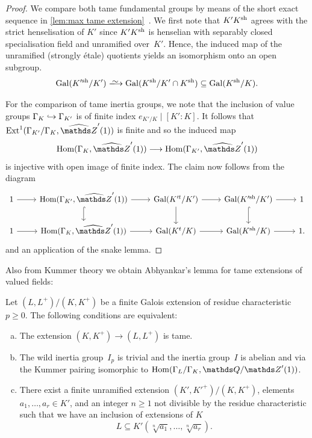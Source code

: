 \begin{proof}
We compare both tame fundamental groups by means of the short exact sequence in \cref{lem:max tame extension}~.
We first note that $K'K^{\rm sh}$ agrees with the strict henselisation of $K'$  since $K'K^{\rm sh}$ is henselian with separably closed specialisation field and unramified over~$K'$.
Hence, the induced map of the unramified (strongly \'etale) quotients yields an isomorphism onto an open subgroup.
\[
\Gal(K'^\sh/K') \isomto \Gal(K^\sh/K'\cap K^\sh) \subseteq \Gal(K^\sh/K).
\]

For the comparison of tame inertia groups, we note that the inclusion of value groups $\Gamma_K \hookrightarrow \Gamma_{K'}$
is of finite index $e_{K'/K} \mid [K':K]$. It follows that $\Ext^1(\Gamma_{K'}/\Gamma_K, \hZ'(1))$ is finite and so the induced map 
\[
\Hom(\Gamma_K,\hZ'(1)) \la \Hom(\Gamma_{K'},\hZ'(1))
\]
is injective with open image of finite index. The claim now follows from  the diagram
\[
 \begin{tikzcd}
    1 \ar[r]    & \Hom(\Gamma_{K'},\hZ'(1)) \ar[r] \ar[d,hookrightarrow]   & \Gal(K'^t/K') \ar[r]    \ar[d]  & \Gal(K'^\sh/K') \ar[r]  \ar[d,hookrightarrow]   & 1 \\
    1 \ar[r]    & \Hom(\Gamma_K,\hZ'(1)) \ar[r]   & \Gal(K^t/K) \ar[r]    & \Gal(K^\sh/K) \ar[r]  & 1. 
 \end{tikzcd}
\]
and an application of the snake lemma.
\end{proof}

Also from Kummer theory we obtain Abhyankar's lemma for tame extensions of valued fields:

\begin{lem} \label{lem:tameness-conditions-galois}
    Let $(L,L^+)/(K,K^+)$ be a finite Galois extension of residue characteristic $p \ge 0$.
    The following conditions are equivalent:
    \begin{enumerate}[(a)]
        \item 
        \label{lemitem:tame}
        The extension $(K,K^+) \to (L,L^+)$ is tame.
        \item
        \label{lemitem:tame-galois}
        The wild inertia group~$I_p$ is trivial and the inertia group~$I$ is abelian and via the Kummer pairing isomorphic to $\Hom(\Gamma_L/\Gamma_K,\bQ/\bZ'(1))$.
        \item
        \label{lemitem:tame-abhyankar}
        There exist a finite unramified extension $(K',K'^+)/(K,K^+)$, elements $a_1, \ldots, a_r\in K'$, and an integer $n\geq 1$ not divisible by the residue characteristic such that we have an inclusion of extensions of $K$
        \[ 
            L \subseteq K'(\sqrt[n]{a_1}, \ldots, \sqrt[n]{a_r}).
        \]
    \end{enumerate}
\end{lem}

